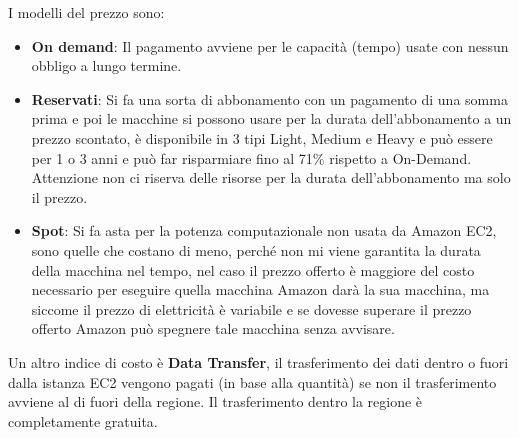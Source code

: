 \documentclass[11pt, twocolumn]{article}
\begin{document}
I modelli del prezzo sono:
\begin{itemize}[noitemsep,topsep=0ex,wide]
	\item \textbf{On demand}: Il pagamento avviene per le capacità (tempo) usate con nessun obbligo a lungo termine.
	\item \textbf{Reservati}: Si fa una sorta di abbonamento con un pagamento di una somma prima e poi le macchine si possono usare per la durata dell'abbonamento a un prezzo scontato, è disponibile in 3 tipi Light, Medium e Heavy e può essere per 1 o 3 anni e può far risparmiare fino al 71\% rispetto a On-Demand. Attenzione non ci riserva delle risorse per la durata dell'abbonamento ma solo il prezzo.\\
	\item \textbf{Spot}: Si fa asta per la potenza computazionale non usata da Amazon EC2, sono quelle che costano di meno, perché non mi viene garantita la durata della macchina nel tempo, nel caso il prezzo offerto è maggiore del costo necessario per eseguire quella macchina Amazon darà la sua macchina, ma siccome il prezzo di elettricità è variabile e se dovesse superare il prezzo offerto Amazon può spegnere tale macchina senza avvisare.
\end{itemize}
Un altro indice di costo è \textbf{Data Transfer}, il trasferimento dei dati dentro o fuori dalla istanza EC2 vengono pagati (in base alla quantità) se non il trasferimento avviene al di fuori della regione. 
Il trasferimento dentro la regione è completamente gratuita.\\
\end{document}

